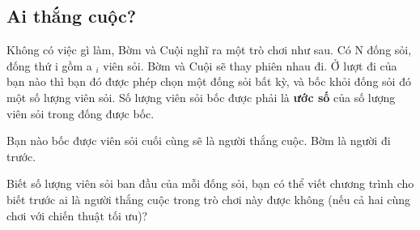 \subsection{   Ai thắng cuộc?  }

   Không có việc gì làm, Bờm và Cuội nghĩ ra một trò chơi như sau. Có N đống sỏi, đống thứ i gồm a   $_    i   $   viên sỏi. Bờm và Cuội sẽ thay phiên nhau đi. Ở lượt đi của bạn nào thì bạn đó được phép chọn một đống sỏi bất kỳ, và bốc  khỏi đống sỏi đó một số lượng viên sỏi. Số lượng viên sỏi bốc được phải là   \textbf{    ước số   }   của số lượng viên sỏi trong đống được bốc.  

   Bạn nào bốc được viên sỏi cuối cùng sẽ là người thắng cuộc. Bờm là người đi trước.  

   Biết số lượng viên sỏi ban đầu của mỗi đống sỏi, bạn có thể viết chương trình cho biết trước ai là người thắng cuộc trong trò chơi này được không (nếu cả hai cùng chơi với chiến thuật tối ưu)?
